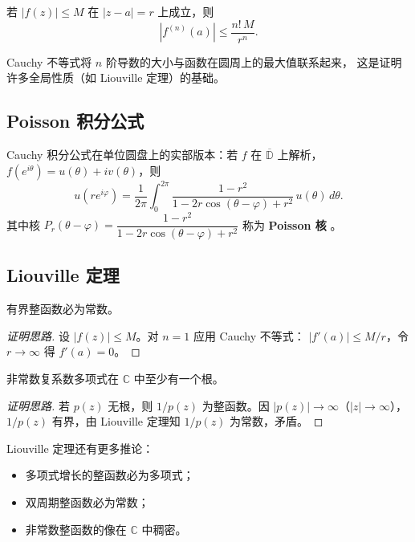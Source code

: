 \begin{corollary}
若 $|f(z)| \leq M$ 在 $|z-a| = r$ 上成立，则
\[
  |f^{(n)}(a)| \leq \frac{n!\,M}{r^n}.
\]
\end{corollary}

\begin{remark}
Cauchy 不等式将 $n$ 阶导数的大小与函数在圆周上的最大值联系起来，
这是证明许多全局性质（如 Liouville 定理）的基础。
\end{remark}

\subsection{Poisson 积分公式}

Cauchy 积分公式在单位圆盘上的实部版本：若 $f$ 在 $\overline{\mathbb{D}}$ 上解析，
$f(e^{i\theta}) = u(\theta) + iv(\theta)$，则
\[
  u(re^{i\varphi}) = \frac{1}{2\pi}\int_0^{2\pi}
  \frac{1 - r^2}{1 - 2r\cos(\theta - \varphi) + r^2}\,u(\theta)\,d\theta.
\]
其中核 $P_r(\theta - \varphi) = \dfrac{1 - r^2}{1 - 2r\cos(\theta-\varphi)+r^2}$
称为 \textbf{Poisson 核} 。

\subsection{Liouville 定理}

\begin{theorem}
有界整函数必为常数。
\end{theorem}

\begin{proof}[证明思路]
设 $|f(z)| \leq M$。对 $n=1$ 应用 Cauchy 不等式：
$|f'(a)| \leq M/r$，令 $r \to \infty$ 得 $f'(a) = 0$。
\end{proof}

\begin{corollary}
非常数复系数多项式在 $\mathbb{C}$ 中至少有一个根。
\end{corollary}

\begin{proof}[证明思路]
若 $p(z)$ 无根，则 $1/p(z)$ 为整函数。因 $|p(z)| \to \infty$（$|z| \to \infty$），
$1/p(z)$ 有界，由 Liouville 定理知 $1/p(z)$ 为常数，矛盾。
\end{proof}

\begin{remark}
Liouville 定理还有更多推论：
\begin{itemize}
  \item 多项式增长的整函数必为多项式；
  \item 双周期整函数必为常数；
  \item 非常数整函数的像在 $\mathbb{C}$ 中稠密。
\end{itemize}
\end{remark}

